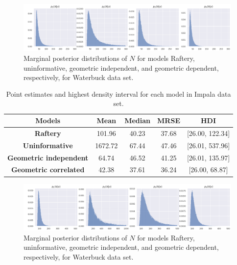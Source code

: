 \begin{figure}[ht]
    \centering
    \includegraphics[width=\textwidth]{../../images/marginal-distributions.png}
    \caption{Marginal posterior distributions of $N$ for models Raftery, uninformative, geometric independent, and geometric dependent, respectively, for Waterbuck data set.}
    \label{fig:marginal-posteriors}
\end{figure}

\begin{table}[!ht]
    \centering
    \begin{tabular}{|c|c|c|c|c|}
        \hline
        {\bf Models} & {\bf Mean} &  {\bf Median} &   {\bf MRSE} &
        {\bf HDI} \\\hline
        {\bf Raftery} &   101.96 &   40.23 &  37.68 &  [26.00, 122.34] \\\hline
        {\bf Uninformative} &  1672.72 &   67.44 &  47.46 &   [26.01, 537.96] \\\hline
        {\bf Geometric independent} &    64.74 &   46.52 &  41.25 &  [26.01, 135.97] \\\hline
        {\bf Geometric correlated} &    42.38 &   37.61 &  36.24 &    [26.00, 68.87] \\\hline
        \end{tabular}
        \caption{Point estimates and highest density interval for each model in Impala data set.}
        \label{tab:summary-statistics-posterior-impala}
\end{table}

\begin{figure}[!ht]
    \centering
    \includegraphics[width=\textwidth]{../../images/marginal-distributions-waterbuck.png}
    \caption{Marginal posterior distributions of $N$ for models Raftery, uninformative, geometric independent, and geometric dependent, respectively, for Waterbuck data set.}
    \label{fig:marginal-posteriors-waterbuck}
\end{figure}

